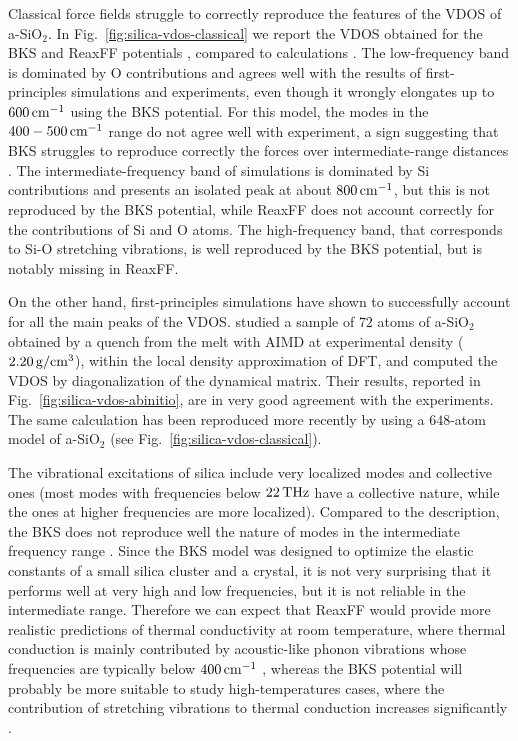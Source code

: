 Classical force fields struggle to correctly reproduce the features of the VDOS of a-SiO$_2$. In Fig.~\ref{fig:silica-vdos-classical} we report the VDOS obtained for the BKS and ReaxFF potentials \cite{Tian2017}, compared to \abinitio calculations \cite{Bhattarai2016}. 
The low-frequency band is dominated by O contributions and agrees well with the results of first-principles simulations and experiments, even though it wrongly elongates up to $600\,\mathrm{cm^{-1}}$ using the BKS potential. For this model, the modes in the $400-500\,\mathrm{cm^{-1}}$ range do not agree well with experiment, a sign suggesting that BKS struggles to reproduce correctly the forces over intermediate-range distances \cite{Vollmayr1996,Benoit2002}. 
The intermediate-frequency band of \abinitio simulations is dominated by Si contributions and presents an isolated peak at about $800\,\mathrm{cm^{-1}}$, but this is not reproduced by the BKS potential, while ReaxFF does not account correctly for the contributions of Si and O atoms. 
The high-frequency band, that corresponds to Si-O stretching vibrations, is well reproduced by the BKS potential, but is notably missing in ReaxFF. 

On the other hand, first-principles simulations have shown to successfully account for all the main peaks of the VDOS. \textcite{Sarnthein1997} studied a sample of $72$ atoms of a-SiO$_2$ obtained by a quench from the melt with AIMD at experimental density ($2.20\,\mathrm{g/cm^3}$), within the local density approximation of DFT, and computed the VDOS by diagonalization of the dynamical matrix. Their results, reported in Fig.~\ref{fig:silica-vdos-abinitio}, are in very good agreement with the experiments. The same calculation has been reproduced more recently by \textcite{Bhattarai2016} using a $648$-atom model of a-SiO$_2$ (see Fig.~\ref{fig:silica-vdos-classical}). 

The vibrational excitations of silica include very localized modes and collective ones (most modes with frequencies below $22\,\mathrm{THz}$ have a collective nature, while the ones at higher frequencies are more localized). Compared to the \abinitio description, the BKS does not reproduce well the nature of modes in the intermediate frequency range \cite{Benoit2002}. Since the BKS model was designed to optimize the elastic constants of a small silica cluster and a crystal, it is not very surprising that it performs well at very high and low frequencies, but it is not reliable in the intermediate range. 
Therefore we can expect that ReaxFF would provide more realistic predictions of thermal conductivity at room temperature, where thermal conduction is mainly contributed by acoustic-like phonon vibrations whose frequencies are typically below $400\,\mathrm{cm^{-1}}$ \cite{Bhattarai2016}, whereas the BKS potential will probably be more suitable to study high-temperatures cases, where the contribution of stretching vibrations to thermal conduction increases significantly \cite{Tian2017}. 


